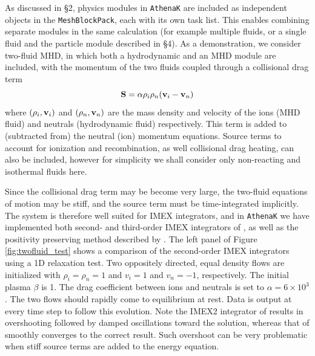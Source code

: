 \documentclass[twocolumn, floatfix]{aastex63}
\newcommand{\ak}{\texttt{AthenaK}}
\begin{document}
As discussed in \S2, physics modules in \ak{} are included as independent objects in the {\tt MeshBlockPack}, each with its own task list.  This enables combining separate modules in the same calculation (for example multiple fluids, or a single fluid and the particle module described in \S4).  As a demonstration, we consider two-fluid MHD, in which both a hydrodynamic and an MHD module are included, with the momentum of the two fluids coupled through a collisional drag term
\begin{equation}
    {\bf S} = \alpha \rho_i \rho_n ({\bf v}_i - {\bf v}_n)
\end{equation}
where $(\rho_i, {\bf v}_i)$ and $(\rho_n, {\bf v}_n)$ are the mass density and velocity of the ions (MHD fluid) and neutrals (hydrodynamic fluid) respectively.  This term is added to (subtracted from) the neutral (ion) momentum equations.  Source terms to account for ionization and recombination, as well collisional drag heating, can also be included, however for simplicity we shall consider only non-reacting and isothermal fluids here.

Since the collisional drag term may be become very large, the two-fluid equations of motion may be stiff, and the source term must be time-integrated implicitly. The system is therefore well suited for IMEX integrators, and in \ak{} we have implemented both second- and third-order IMEX integrators of \cite{PareschiRusso}, as well as the positivity preserving method described by \cite{krapp2024ApJS..271....7K}.  The left panel of Figure \ref{fig:twofluid_test} shows
a comparison of the second-order IMEX integrators using a 1D relaxation test. Two oppositely directed, equal density flows are initialized with $\rho_i = \rho_n = 1$ and $v_i = 1$ and $v_n = -1$, respectively. The initial plasma $\beta$ is 1. The drag coefficient between ions and neutrals is set to $\alpha = 6\times 10^3$.  The two flows should rapidly come to equilibrium at rest.  Data is output at every time step to follow this evolution.  Note the IMEX2 integrator of \cite{PareschiRusso}
results in overshooting followed by damped oscillations toward the solution, whereas that of \cite{krapp2024ApJS..271....7K} smoothly converges to the correct result.  Such overshoot can be very problematic when stiff source terms are added to the energy equation.
\end{document}
